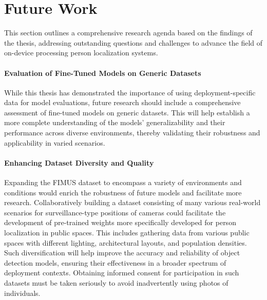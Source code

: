 \section{Future Work}
\label{sec:future_work}
This section outlines a comprehensive research agenda based on the findings of the thesis, addressing outstanding questions and challenges to advance the field of on-device processing person localization systems.

\paragraph{Evaluation of Fine-Tuned Models on Generic Datasets}
While this thesis has demonstrated the importance of using deployment-specific data for model evaluations, future research should include a comprehensive assessment of fine-tuned models on generic datasets. This will help establish a more complete understanding of the models' generalizability and their performance across diverse environments, thereby validating their robustness and applicability in varied scenarios.

\paragraph{Enhancing Dataset Diversity and Quality}
Expanding the FIMUS dataset to encompass a variety of environments and conditions would enrich the robustness of future models and facilitate more research. Collaboratively building a dataset consisting of many various real-world scenarios for surveillance-type positions of cameras could facilitate the development of pre-trained weights more specifically developed for person localization in public spaces. This includes gathering data from various public spaces with different lighting, architectural layouts, and population densities. Such diversification will help improve the accuracy and reliability of object detection models, ensuring their effectiveness in a broader spectrum of deployment contexts. Obtaining informed consent for participation in such datasets must be taken seriously to avoid inadvertently using photos of individuals. 


